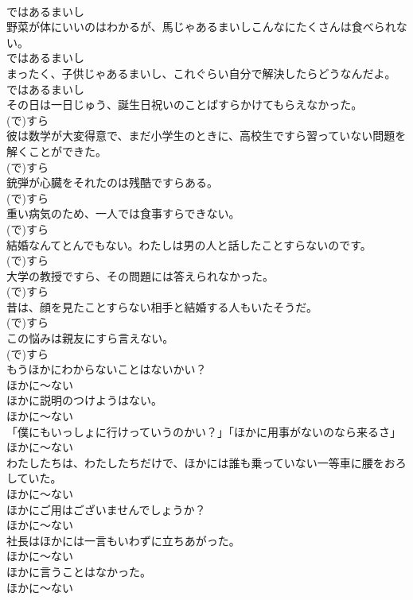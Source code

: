 \documentclass[8pt]{extreport}
\begin{document}
\begin{CJK}{UTF8}{min}
\\	ではあるまいし
\\	野菜が体にいいのはわかるが、馬じゃあるまいしこんなにたくさんは食べられない。	
\\	ではあるまいし
\\	まったく、子供じゃあるまいし、これぐらい自分で解決したらどうなんだよ。	
\\	ではあるまいし
\\	その日は一日じゅう、誕生日祝いのことばすらかけてもらえなかった。	
\\	(で)すら
\\	彼は数学が大変得意で、まだ小学生のときに、高校生ですら習っていない問題を解くことができた。	
\\	(で)すら
\\	銃弾が心臓をそれたのは残酷ですらある。	
\\	(で)すら
\\	重い病気のため、一人では食事すらできない。	
\\	(で)すら
\\	結婚なんてとんでもない。わたしは男の人と話したことすらないのです。	
\\	(で)すら
\\	大学の教授ですら、その問題には答えられなかった。	
\\	(で)すら
\\	昔は、顔を見たことすらない相手と結婚する人もいたそうだ。	
\\	(で)すら
\\	この悩みは親友にすら言えない。	
\\	(で)すら
\\	もうほかにわからないことはないかい？	
\\	ほかに～ない
\\	ほかに説明のつけようはない。	
\\	ほかに～ない
\\	「僕にもいっしょに行けっていうのかい？」「ほかに用事がないのなら来るさ」	
\\	ほかに～ない
\\	わたしたちは、わたしたちだけで、ほかには誰も乗っていない一等車に腰をおろしていた。	
\\	ほかに～ない
\\	ほかにご用はございませんでしょうか？	
\\	ほかに～ない
\\	社長はほかには一言もいわずに立ちあがった。	
\\	ほかに～ない
\\	ほかに言うことはなかった。	
\\	ほかに～ない

\end{CJK}
\end{document}
